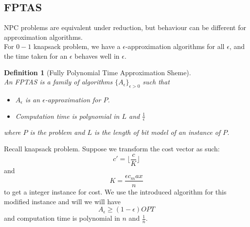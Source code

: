 \documentclass[12pt]{article}
\newtheorem{definition}{Definition}[section]
\theoremstyle{definition}
\begin{document}
\subsection{FPTAS}
NPC problems are equivalent under reduction, but behaviour can be different for approximation algorithms. \\
For $0-1$ knapsack problem, we have a $\epsilon$-approximation algorithms for all $\epsilon$, and the time taken for an $\epsilon$ behaves well in $\epsilon$.
\begin{definition}[Fully Polynomial Time Approximation Sheme]
\hfill\\\normalfont An FPTAS is a family of algorithms $\{A_\epsilon\}_{\epsilon>0}$ such that
\begin{itemize}
  \item $A_\epsilon$ is an $\epsilon$-approximation for $P$.
  \item Computation time is polynomial in $L$ and $\frac{1}{\epsilon}$
\end{itemize}
where $P$ is the problem and $L$ is the length of bit model of an instance of $P$.
\end{definition}
Recall knapsack problem. Suppose we transform the cost vector as such:
\[
c'=\lfloor\frac{c}{K}\rfloor
\]
and
\[
K=\frac{\epsilon c_max}{n}
\]
to get a integer instance for cost. We use the introduced algorithm for this modified instance and will we will have
\[
A_\epsilon\geq (1-\epsilon)OPT
\]
and computation time is polynomial in $n$ and $\frac{1}{n}$.
\end{document}
